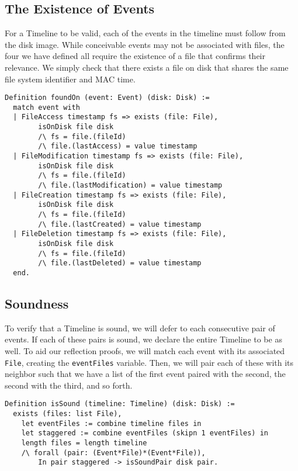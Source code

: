 \documentclass[nocopyrightspace]{sigplanconf}
\begin{document}
\subsection{The Existence of Events}

For a Timeline to be valid, each of the events in the timeline must follow
from the disk image. While conceivable events may not be associated with
files, the four we have defined all require the existence of a file that
confirms their relevance. We simply check that there exists a file on disk
that shares the same file system identifier and MAC time.

\begin{lstlisting}
Definition foundOn (event: Event) (disk: Disk) :=
  match event with
  | FileAccess timestamp fs => exists (file: File),
        isOnDisk file disk
        /\ fs = file.(fileId)
        /\ file.(lastAccess) = value timestamp
  | FileModification timestamp fs => exists (file: File),
        isOnDisk file disk
        /\ fs = file.(fileId)
        /\ file.(lastModification) = value timestamp
  | FileCreation timestamp fs => exists (file: File),
        isOnDisk file disk
        /\ fs = file.(fileId)
        /\ file.(lastCreated) = value timestamp
  | FileDeletion timestamp fs => exists (file: File),
        isOnDisk file disk
        /\ fs = file.(fileId)
        /\ file.(lastDeleted) = value timestamp
  end.
\end{lstlisting}

\subsection{Soundness}

To verify that a Timeline is sound, we will defer to each consecutive pair of
events. If each of these pairs is sound, we declare the entire Timeline to be
as well. To aid our reflection proofs, we will match each event with its
associated {\tt File}, creating the {\tt eventFiles} variable. Then, we will
pair each of these with its neighbor such that we have a list of the first
event paired with the second, the second with the third, and so forth.

\begin{lstlisting}
Definition isSound (timeline: Timeline) (disk: Disk) :=
  exists (files: list File),
    let eventFiles := combine timeline files in
    let staggered := combine eventFiles (skipn 1 eventFiles) in
    length files = length timeline
    /\ forall (pair: (Event*File)*(Event*File)),
        In pair staggered -> isSoundPair disk pair.
\end{lstlisting}
\end{document}
